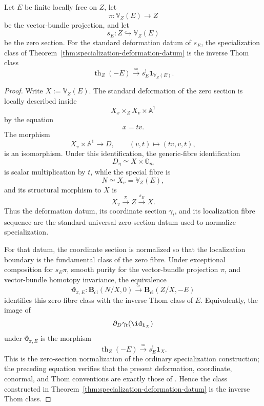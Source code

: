 \begin{lemma}
\label{lem:specialization-zero-section-normalization}
Let \(E\) be finite locally free on \(Z\), let
\[
    \pi:\mathbb V_Z(E)\longrightarrow Z
\]
be the vector-bundle projection, and let
\[
    s_E:Z\hookrightarrow\mathbb V_Z(E)
\]
be the zero section.  For the standard deformation datum of \(s_E\), the
specialization class of
Theorem~\ref{thm:specialization-deformation-datum} is the inverse Thom
class
\[
    \operatorname{th}_Z(-E)
    \xrightarrow{\simeq}
    s_E^!\mathbf1_{\mathbb V_Z(E)}.
\]
\end{lemma}

\begin{proof}
Write \(X:=\mathbb V_Z(E)\).  The standard deformation of the zero section
is locally described inside
\[
    X_x\times_ZX_v\times\mathbb A^1
\]
by the equation
\[
    x=tv.
\]
The morphism
\[
    X_v\times\mathbb A^1
    \longrightarrow
    D,
    \qquad
    (v,t)\longmapsto(tv,v,t),
\]
is an isomorphism.  Under this identification, the generic-fibre
identification
\[
    D_\eta\simeq X\times\mathbb G_m
\]
is scalar multiplication by \(t\), while the special fibre is
\[
    N\simeq X_v=\mathbb V_Z(E),
\]
and its structural morphism to \(X\) is
\[
    X_v\xrightarrow{\pi}Z\xrightarrow{s_E}X.
\]
Thus the deformation datum, its coordinate section \(\gamma_t\), and its
localization fibre sequence are the standard universal zero-section datum
used to normalize specialization.

For that datum, the coordinate section is normalized so that the
localization boundary is the fundamental class of the zero fibre.  Under
exceptional composition for \(s_E\pi\), smooth purity for the vector-bundle
projection \(\pi\), and vector-bundle homotopy invariance, the equivalence
\[
    \boldsymbol{\vartheta}_{\pi,E}:
    \mathbf B_{\mathrm{cl}}(N/X,0)
    \xrightarrow{\simeq}
    \mathbf B_{\mathrm{cl}}(Z/X,-E)
\]
identifies this zero-fibre class with the inverse Thom class of \(E\).
Equivalently, the image of
\[
    \partial_D\gamma_t(\id_{\mathbf1_X})
\]
under \(\boldsymbol{\vartheta}_{\pi,E}\) is the morphism
\[
    \operatorname{th}_Z(-E)
    \xrightarrow{\simeq}
    s_E^!\mathbf1_X.
\]
This is the zero-section normalization of the ordinary specialization
construction; the preceding equation verifies that the present deformation,
coordinate, conormal, and Thom conventions are exactly those of
\cite[Section~3.2]{DegliseJinKhanFundamentalClasses}.  Hence the class
constructed in Theorem~\ref{thm:specialization-deformation-datum} is the
inverse Thom class.
\end{proof}

